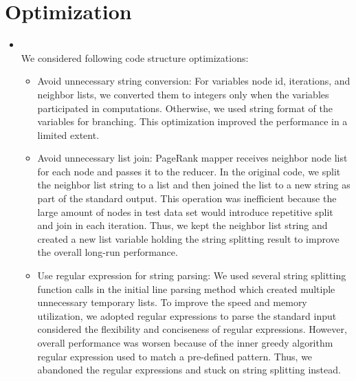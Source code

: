 \section{Optimization}
\medskip
\begin{itemize}
    \item {}\\
    We considered following code structure optimizations:
    \begin{itemize}
    \item Avoid unnecessary string conversion: For variables node id, iterations, and neighbor lists, we converted them to integers only when the variables participated in computations. Otherwise, we used string format of the variables for branching. This optimization improved the performance in a limited extent.
    \item Avoid unnecessary list join: PageRank mapper receives neighbor node list for each node and passes it to the reducer. In the original code, we split the neighbor list string to a list and then joined the list to a new string as part of the standard output. This operation was inefficient because the large amount of nodes in test data set would introduce repetitive split and join in each iteration. Thus, we kept the neighbor list string and created a new list variable holding the string splitting result to improve the overall long-run performance.
    \item Use regular expression for string parsing: We used several string splitting function calls in the initial line parsing method which created multiple unnecessary temporary lists. To improve the speed and memory utilization, we adopted regular expressions to parse the standard input considered the flexibility and conciseness of regular expressions. However, overall performance was worsen because of the inner greedy algorithm regular expression used to match a pre-defined pattern. Thus, we abandoned the regular expressions and stuck on string splitting instead.
    \end{itemize}
    

\end{itemize}
